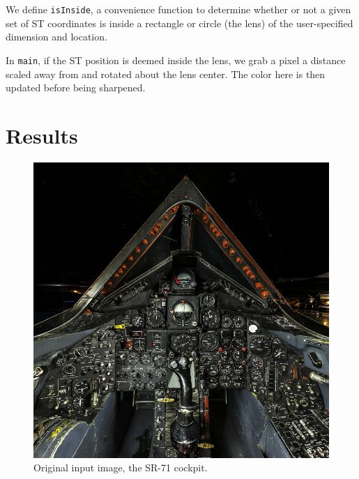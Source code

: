 \documentclass[12pt,letterpaper]{article}
\begin{document}
We define {\tt isInside}, a convenience function to determine whether or not
a given set of ST coordinates is inside a rectangle or circle (the lens) of the
user-specified dimension and location.

In {\tt main}, if the ST position is deemed inside the lens, we grab a pixel
a distance scaled away from and rotated about the lens center. The color here
is then updated before being sharpened.


\newpage
\section*{Results}

\begin{figure}[!h]
    \centering
    \includegraphics[width=1.0\textwidth]{img/sr71.png}
    \caption{Original input image, the SR-71 cockpit.}
\end{figure}
\end{document}
